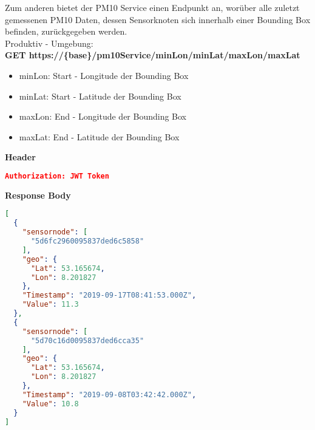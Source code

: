 Zum anderen bietet der PM10 Service einen Endpunkt an, worüber alle zuletzt gemessenen PM10 Daten, dessen Sensorknoten sich innerhalb einer Bounding Box befinden, zurückgegeben werden.
\\
Produktiv - Umgebung:
\\
\textbf{GET https://\{base\}/pm10Service/minLon/minLat/maxLon/maxLat}
\\
\begin{itemize}
	\item minLon: Start - Longitude der Bounding Box
	\item minLat: Start - Latitude der Bounding Box
	\item maxLon: End - Longitude der Bounding Box
	\item maxLat: End - Latitude der Bounding Box
\end{itemize}
\textbf{Header}
\begin{lstlisting}[language=json,firstnumber=1,basicstyle=\footnotesize]
Authorization: JWT Token
\end{lstlisting}
\textbf{Response Body}
\begin{lstlisting}[language=json,firstnumber=1,basicstyle=\footnotesize]
[
  {
    "sensornode": [
      "5d6fc2960095837ded6c5858"
    ],
    "geo": {
      "Lat": 53.165674,
      "Lon": 8.201827
    },
    "Timestamp": "2019-09-17T08:41:53.000Z",
    "Value": 11.3
  },
  {
    "sensornode": [
      "5d70c16d0095837ded6cca35"
    ],
    "geo": {
      "Lat": 53.165674,
      "Lon": 8.201827
    },
    "Timestamp": "2019-09-08T03:42:42.000Z",
    "Value": 10.8
  }
]
\end{lstlisting}

